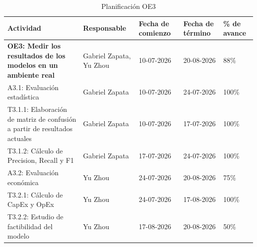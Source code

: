 \documentclass[12pt,a4paper]{article}
\begin{document}
    \begin{table}[H]
            \centering
            \renewcommand{\arraystretch}{1.5}
            \begin{tabular}{|p{5cm}|p{3cm}|p{2cm}|p{2cm}|p{2cm}|}
            \hline
            \textbf{Actividad} & \textbf{Responsable} & \textbf{Fecha de comienzo} & \textbf{Fecha de término} & \textbf{\% de avance} \\ \hline
            \textbf{OE3: Medir los resultados de los modelos en un ambiente real} & Gabriel Zapata, Yu Zhou & 10-07-2026 & 20-08-2026 & 88\% \\ \hline
            A3.1: Evaluación estadística & Gabriel Zapata & 10-07-2026 & 24-07-2026 & 100\% \\ \hline
            T3.1.1: Elaboración de matriz de confusión a partir de resultados actuales & Gabriel Zapata & 10-07-2026 & 17-07-2026 & 100\% \\ \hline
            T3.1.2: Cálculo de Precision, Recall y F1 & Gabriel Zapata & 17-07-2026 & 24-07-2026 & 100\% \\ \hline
            A3.2: Evaluación económica & Yu Zhou & 24-07-2026 & 20-08-2026 & 75\% \\ \hline
            T3.2.1: Cálculo de CapEx y OpEx & Yu Zhou & 24-07-2026 & 17-08-2026 & 100\% \\ \hline
            T3.2.2: Estudio de factibilidad del modelo & Yu Zhou & 17-08-2026 & 20-08-2026 & 50\% \\ \hline
            \end{tabular}
            \caption{Planificación OE3}
            \label{tab:planificacion_avance_oe3}
    \end{table}
\end{document}
